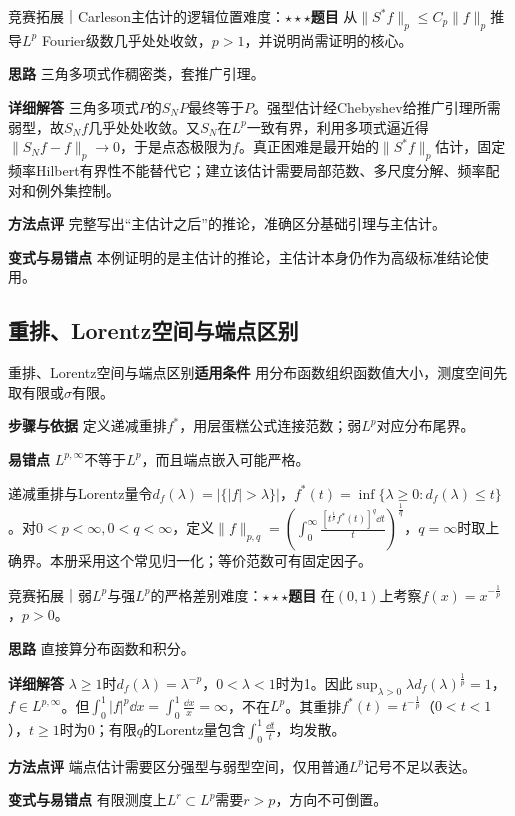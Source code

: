 \begin{example}{竞赛拓展｜Carleson主估计的逻辑位置}{难度：$\star\star\star$}\label{deep:ex:fourier_source_deep:carlesongap}\textbf{题目} 从$\|S^*f\|_p\le C_p\|f\|_p$推导$L^p$ Fourier级数几乎处处收敛，$p>1$，并说明尚需证明的核心。\par\textbf{思路} 三角多项式作稠密类，套推广引理。\par\textbf{详细解答} 三角多项式$P$的$S_NP$最终等于$P$。强型估计经Chebyshev给推广引理所需弱型，故$S_Nf$几乎处处收敛。又$S_N$在$L^p$一致有界，利用多项式逼近得$\|S_Nf-f\|_p\to0$，于是点态极限为$f$。真正困难是最开始的$\|S^*f\|_p$估计，固定频率Hilbert有界性不能替代它；建立该估计需要局部范数、多尺度分解、频率配对和例外集控制。\par\textbf{方法点评} 完整写出“主估计之后”的推论，准确区分基础引理与主估计。\par\textbf{变式与易错点} 本例证明的是主估计的推论，主估计本身仍作为高级标准结论使用。\end{example}

\subsection{重排、Lorentz空间与端点区别}\label{deep:fourier_source_deep:rearrangement}

\begin{method}{重排、Lorentz空间与端点区别}\textbf{适用条件} 用分布函数组织函数值大小，测度空间先取有限或$\sigma$有限。\par\textbf{步骤与依据} 定义递减重排$f^*$，用层蛋糕公式连接范数；弱$L^p$对应分布尾界。\par\textbf{易错点} $L^{p,\infty}$不等于$L^p$，而且端点嵌入可能严格。\end{method}

\begin{definition}{递减重排与Lorentz量}令$d_f(\lambda)=|\{|f|>\lambda\}|$，$f^*(t)=\inf\{\lambda\ge0:d_f(\lambda)\le t\}$。对$0<p<\infty,0<q<\infty$，定义$\|f\|_{p,q}=(\int_0^\infty\frac{[t^{\frac{1}{p}}f^*(t)]^q\dd t}{t})^{\frac{1}{q}}$，$q=\infty$时取上确界。本册采用这个常见归一化；等价范数可有固定因子。\end{definition}

\begin{example}{竞赛拓展｜弱$L^p$与强$L^p$的严格差别}{难度：$\star\star\star$}\label{deep:ex:fourier_source_deep:weaklp}\textbf{题目} 在$(0,1)$上考察$f(x)=x^{-\frac{1}{p}}$，$p>0$。\par\textbf{思路} 直接算分布函数和积分。\par\textbf{详细解答} $\lambda\ge1$时$d_f(\lambda)=\lambda^{-p}$，$0<\lambda<1$时为1。因此$\sup_{\lambda>0}\lambda d_f(\lambda)^{\frac{1}{p}}=1$，$f\in L^{p,\infty}$。但$\int_0^1|f|^p\dd x=\int_0^1\frac{\dd x}{x}=\infty$，不在$L^p$。其重排$f^*(t)=t^{-\frac{1}{p}}$（$0<t<1$），$t\ge1$时为0；有限$q$的Lorentz量包含$\int_0^1\frac{\dd t}{t}$，均发散。\par\textbf{方法点评} 端点估计需要区分强型与弱型空间，仅用普通$L^p$记号不足以表达。\par\textbf{变式与易错点} 有限测度上$L^r\subset L^p$需要$r>p$，方向不可倒置。\end{example}

